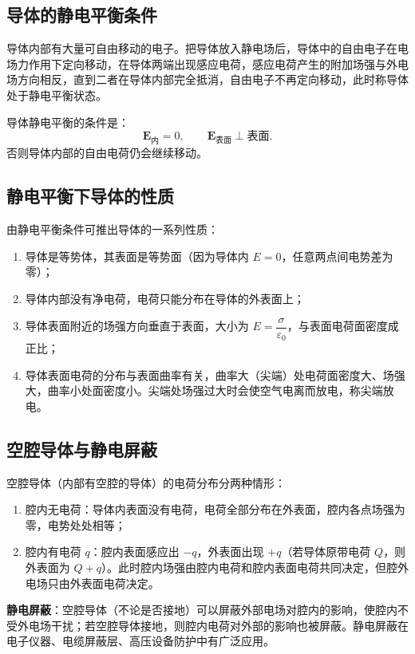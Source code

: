     \subsection{导体的静电平衡条件}
    导体内部有大量可自由移动的电子。把导体放入静电场后，导体中的自由电子在电场力作用下定向移动，在导体两端出现感应电荷，感应电荷产生的附加场强与外电场方向相反，直到二者在导体内部完全抵消，自由电子不再定向移动，此时称导体处于静电平衡状态。

    导体静电平衡的条件是：
    \[
    \boldsymbol{E}_{\text{内}}=0,\qquad \boldsymbol{E}_{\text{表面}}\perp\text{表面}.
    \]
    否则导体内部的自由电荷仍会继续移动。

    \subsection{静电平衡下导体的性质}
    由静电平衡条件可推出导体的一系列性质：
    \begin{enumerate}
        \item 导体是等势体，其表面是等势面（因为导体内 $E=0$，任意两点间电势差为零）；
        \item 导体内部没有净电荷，电荷只能分布在导体的外表面上；
        \item 导体表面附近的场强方向垂直于表面，大小为 $E=\dfrac{\sigma}{\varepsilon_0}$，与表面电荷面密度成正比；
        \item 导体表面电荷的分布与表面曲率有关，曲率大（尖端）处电荷面密度大、场强大，曲率小处面密度小。尖端处场强过大时会使空气电离而放电，称尖端放电。
    \end{enumerate}

    \subsection{空腔导体与静电屏蔽}
    空腔导体（内部有空腔的导体）的电荷分布分两种情形：
    \begin{enumerate}
        \item 腔内无电荷：导体内表面没有电荷，电荷全部分布在外表面，腔内各点场强为零，电势处处相等；
        \item 腔内有电荷 $q$：腔内表面感应出 $-q$，外表面出现 $+q$（若导体原带电荷 $Q$，则外表面为 $Q+q$）。此时腔内场强由腔内电荷和腔内表面电荷共同决定，但腔外电场只由外表面电荷决定。
    \end{enumerate}

    \textbf{静电屏蔽}：空腔导体（不论是否接地）可以屏蔽外部电场对腔内的影响，使腔内不受外电场干扰；若空腔导体接地，则腔内电荷对外部的影响也被屏蔽。静电屏蔽在电子仪器、电缆屏蔽层、高压设备防护中有广泛应用。

